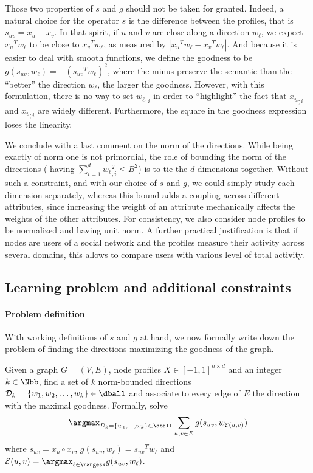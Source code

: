 Those two properties of $s$ and $g$ should not be taken for granted. Indeed, 
a natural choice for the operator $s$ is the difference between the profiles, that is
$s_{uv} = x_u - x_v$. In that spirit, if $u$ and $v$ are close along a direction $w_\ell$, we expect
${x_u}^T w_\ell$ to be close to ${x_v}^T w_\ell$, as measured by $|{x_u}^T w_\ell - {x_v}^T
w_\ell|$. And because it is easier to deal with smooth functions, we define the goodness to be $g(s_{uv},
w_\ell) = -\left({s_{uv}}^T w_\ell \right)^2$, where the minus preserve the semantic than the
\enquote{better} the direction $w_\ell$, the larger the goodness. However, with this formulation,
there is no way to set ${w_\ell}_{;i}$ in order to \enquote{highlight} the fact that ${x_u}_{;i}$
and ${x_v}_{;i}$ are widely different. Furthermore, the square in the goodness expression loses the
linearity.

We conclude with a last comment on the norm of the directions. While being exactly of norm one is
not primordial, the role of bounding the norm of the directions (\ie{} having $\sum_{i=1}^d
{w_\ell}_{;i}^2 \leq B^2$) is to tie the $d$ dimensions together. Without such a constraint, and with
our choice of $s$ and $g$, we could simply study each dimension separately, whereas this bound adds
a coupling across different attributes, since increasing the weight of an attribute mechanically
affects the weights of the other attributes.
For consistency, we also consider node profiles to be normalized and having unit norm. A further
practical justification is that if nodes are users of a social network and the profiles measure
their activity across several domains, this allows to compare users with various level of total
activity.

\subsection{Learning problem and additional constraints}
\label{sub:edge_constraints}

\paragraph{Problem definition}

With working definitions of $s$ and $g$ at hand, we now formally write down the problem of
finding the directions maximizing the goodness of the graph.
\begin{problem}[\ecp{}]
  \label{p:edge_full}
  Given a graph $G=(V, E)$, node profiles $X\in [-1, 1]^{n\times d}$ and an integer $k \in \Nbb$,
  find a set of $k$ norm-bounded directions $\mathcal{D}_k = \{w_1, w_2, \ldots, w_k\} \in \dball$
  and associate to every edge of $E$ the direction with the maximal goodness. Formally, solve
  \begin{equation}
    \label{eq:edge_full}
    \argmax_{\mathcal{D}_k = \{w_1,\ldots,w_k\} \subset \dball}
    \sum_{u,v \in E}  g(s_{uv}, w_{\mathcal{E}(u,v)})
  \end{equation}
  where $s_{uv} = x_u \circ x_v$, $g(s_{uv}, w_{\ell}) = {s_{uv}}^T w_{\ell}$ and $\mathcal{E}(u,v)
  = \argmax_{\ell \in \rangesk} g(s_{uv}, w_\ell)$.
\end{problem}

